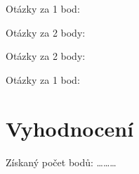 \documentclass[
	13pt,
	a4paper,
	oneside]{sdapsclassic} %
\begin{document}
    \begin{questionnaire}[noinfo]
    \begin{Form}
    \begin{multicols}{4}

        \begin{optiongroup}{Otázky za 1 bod:}
         \end{optiongroup}
        
	    \begin{optiongroup}{Otázky za 2 body:}
        \end{optiongroup}
        
		\begin{optiongroup}{Otázky za 2 body:}
		\end{optiongroup}
    
		\begin{optiongroup}{Otázky za 1 bod:}
        \end{optiongroup}

        \end{multicols}

        \end{Form}
    	\end{questionnaire}
        

        \section{Vyhodnocení}

        \bigskip
        \begin{flushright}
        Získaný počet bodů: \dots\dots\dots
        \end{flushright}
\end{document}
